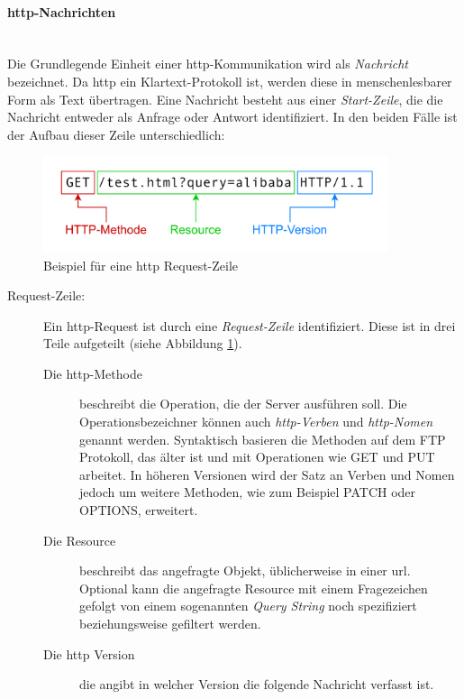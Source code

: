 \paragraph{\ac{http}-Nachrichten \cite{HTTPMessagesHTTP2024}}
\ \\
Die Grundlegende Einheit einer \ac{http}-Kommunikation wird als \textit{Nachricht} bezeichnet.
Da \ac{http} ein Klartext-Protokoll ist, werden diese in menschenlesbarer Form als Text übertragen.
Eine Nachricht besteht aus einer \textit{Start-Zeile}, die die Nachricht entweder als Anfrage oder Antwort identifiziert.
In den beiden Fälle ist der Aufbau dieser Zeile unterschiedlich:

\begin{figure}[!hbt]
     \centering
     \includegraphics[width=0.9\textwidth]{./images/HTTP-Requestline.png}
     \caption{Beispiel für eine \ac{http} Request-Zeile}
     \label{fig:http-requestline}
 \end{figure}

\begin{description}
     \item[Request-Zeile:] Ein \ac{http}-Request ist durch eine \textit{Request-Zeile} identifiziert. Diese ist in drei Teile aufgeteilt (siehe Abbildung \ref{fig:http-requestline}).
     \begin{description}
          \item[Die \ac{http}-Methode] beschreibt die Operation, die der Server ausführen soll.
          Die Operationsbezeichner können auch \textit{\ac{http}-Verben} und \textit{\ac{http}-Nomen} genannt werden.
          Syntaktisch basieren die Methoden auf dem FTP Protokoll, das älter ist und mit Operationen wie GET und PUT arbeitet.
          In höheren Versionen wird der Satz an Verben und Nomen jedoch um weitere Methoden, wie zum Beispiel PATCH oder OPTIONS, erweitert.
          \item[Die Resource] beschreibt das angefragte Objekt, üblicherweise in einer \ac{url}. 
          Optional kann die angefragte Resource mit einem Fragezeichen gefolgt von einem sogenannten \textit{Query String} noch spezifiziert beziehungsweise gefiltert werden.
          \item[Die \ac{http} Version] die angibt in welcher Version die folgende Nachricht verfasst ist. 
     \end{description}
\end{description}


